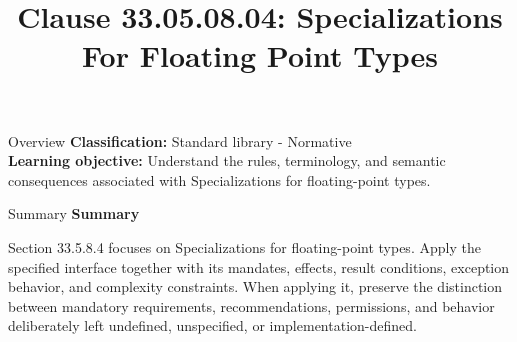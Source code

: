 \documentclass[10pt,letterpaper]{article}
\title{Clause 33.05.08.04: Specializations For Floating Point Types}
\author{}
\date{}
\begin{document}
\maketitle
\begin{CornellOverviewBox}{Overview}
\textbf{Classification:} Standard library - Normative\\[2pt]
\textbf{Learning objective:} Understand the rules, terminology, and semantic consequences associated with Specializations for floating-point types.
\end{CornellOverviewBox}\begin{CornellSummaryBox}{Summary}
{\sffamily\bfseries\color{Accent} Summary}\par\vspace{3pt}Section 33.5.8.4 focuses on Specializations for floating-point types. Apply the specified interface together with its mandates, effects, result conditions, exception behavior, and complexity constraints. When applying it, preserve the distinction between mandatory requirements, recommendations, permissions, and behavior deliberately left undefined, unspecified, or implementation-defined.
\end{CornellSummaryBox}
\end{document}
